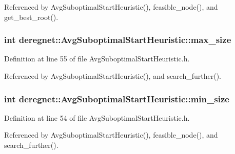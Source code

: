 Referenced by Avg\+Suboptimal\+Start\+Heuristic(), feasible\+\_\+node(), and get\+\_\+best\+\_\+root().

\subsubsection[{\texorpdfstring{max\+\_\+size}{max_size}}]{\setlength{\rightskip}{0pt plus 5cm}int deregnet\+::\+Avg\+Suboptimal\+Start\+Heuristic\+::max\+\_\+size\hspace{0.3cm}{\ttfamily [private]}}\hypertarget{classderegnet_1_1AvgSuboptimalStartHeuristic_aafc01553c8d2a9a877f23c6bdee305aa}{}\label{classderegnet_1_1AvgSuboptimalStartHeuristic_aafc01553c8d2a9a877f23c6bdee305aa}


Definition at line 55 of file Avg\+Suboptimal\+Start\+Heuristic.\+h.



Referenced by Avg\+Suboptimal\+Start\+Heuristic(), and search\+\_\+further().

\subsubsection[{\texorpdfstring{min\+\_\+size}{min_size}}]{\setlength{\rightskip}{0pt plus 5cm}int deregnet\+::\+Avg\+Suboptimal\+Start\+Heuristic\+::min\+\_\+size\hspace{0.3cm}{\ttfamily [private]}}\hypertarget{classderegnet_1_1AvgSuboptimalStartHeuristic_a71b5a73f79c4c161e9df9085ece2c270}{}\label{classderegnet_1_1AvgSuboptimalStartHeuristic_a71b5a73f79c4c161e9df9085ece2c270}


Definition at line 54 of file Avg\+Suboptimal\+Start\+Heuristic.\+h.



Referenced by Avg\+Suboptimal\+Start\+Heuristic(), feasible\+\_\+node(), and search\+\_\+further().

